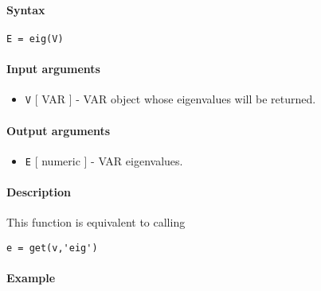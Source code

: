 


	\paragraph{Syntax}

\begin{verbatim}
E = eig(V)
\end{verbatim}

\paragraph{Input arguments}

\begin{itemize}
\itemsep1pt\parskip0pt
\item
  \texttt{V} {[} VAR {]} - VAR object whose eigenvalues will be
  returned.
\end{itemize}

\paragraph{Output arguments}

\begin{itemize}
\itemsep1pt\parskip0pt
\item
  \texttt{E} {[} numeric {]} - VAR eigenvalues.
\end{itemize}

\paragraph{Description}

This function is equivalent to calling

\begin{verbatim}
e = get(v,'eig')
\end{verbatim}

\paragraph{Example}


